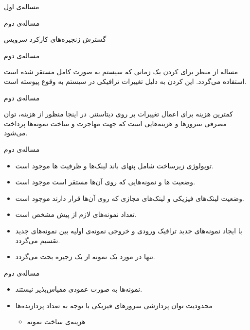 \documentclass{beamer}
\makeatletter
\newcommand{\RTList}{\raggedleft\rightskip\@totalleftmargin}
\makeatother
\begin{document}
\begin{persian}
\begin{frame}{مساله‌ی اول}
\end{frame}
\begin{frame}
	\begin{multicols}{3}
		\begin{center}	
			مساله‌ی دوم
		\end{center}
	\end{multicols}
	\begin{center}	
		گسترش زنجیره‌های کارکرد سرویس
	\end{center}
\end{frame}
\begin{frame}{مساله‌ی دوم}
	\par
	مساله از منظر  برای  کردن یک 
	زمانی که سیستم به صورت کامل مستقر شده است استفاده می‌گردد.
	این  کردن به دلیل تغییرات ترافیکی در سیستم به وقوع پیوسته است.
\end{frame}
\begin{frame}{مساله‌ی دوم}
	\par
	کمترین هزینه برای اعمال تغییرات بر روی دیتاسنتر.
	در اینجا منظور از هزینه، توان مصرفی سرورها و هزینه‌هایی است که جهت مهاجرت و ساخت نمونه‌ها پرداخت می‌شود.
\end{frame}
\begin{frame}{مساله‌ی دوم}
	\begin{itemize}\RTList
		\item توپولوژی زیرساخت شامل پنهای باند لینک‌ها و ظرفیت ها موجود است.
		\item وضعیت ها و نمونه‌هایی که روی آن‌ها مستقر است موجود است.
		\item وضعیت لینک‌های فیزیکی و لینک‌های مجازی که روی آن‌ها قرار دارند موجود است.
		\item تعداد نمونه‌های لازم از پیش مشخص است.
		\item با ایجاد نمونه‌های جدید ترافیک ورودی و خروجی نمونه‌ی اولیه بین نمونه‌های جدید تقسیم می‌گردد.
		\item تنها در مورد یک نمونه از یک زجیره بحث می‌گردد.
	\end{itemize}
\end{frame}
\begin{frame}{مساله‌ی دوم}
	\begin{itemize}\RTList
		\item نمونه‌ها به صورت عمودی مقیاس‌پذیر نیستند.
		\item محدودیت توان پردازشی سرورهای فیزیکی با توجه به تعداد پردازنده‌ها
		\begin{itemize}\RTList
			\item هزینه‌ی ساخت نمونه

\end{itemize}
\end{itemize}
\end{frame}
\end{persian}
\end{document}
